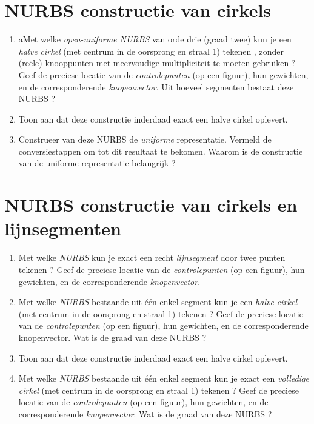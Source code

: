 \documentclass{report}
\begin{document}
	\section{NURBS constructie van cirkels }
	\begin{enumerate}
		\item aMet welke \textit{open-uniforme NURBS} van orde drie (graad twee) kun je een \textit{halve cirkel} (met centrum in de oorsprong en straal 1) tekenen , zonder (reële) knooppunten met meervoudige multipliciteit te moeten gebruiken ? Geef de preciese locatie van de \textit{controlepunten} (op een figuur), hun gewichten, en de corresponderende \textit{knopenvector}. Uit hoeveel segmenten bestaat deze NURBS ?
		
		\item Toon aan dat deze constructie inderdaad exact een halve cirkel oplevert.
		
		\item Construeer van deze NURBS de \textit{uniforme} representatie. Vermeld de conversiestappen om tot dit resultaat te bekomen. Waarom is de constructie van de uniforme representatie belangrijk ?
	\end{enumerate}

	\section{NURBS constructie van cirkels en lijnsegmenten  }
	\begin{enumerate}
		\item Met welke \textit{NURBS} kun je exact een recht \textit{lijnsegment} door twee punten tekenen ? Geef de preciese locatie van de \textit{controlepunten} (op een figuur), hun gewichten, en de corresponderende \textit{knopenvector}.
		
		\item Met welke \textit{NURBS} bestaande uit één enkel segment kun je een \textit{halve cirkel} (met centrum in de oorsprong en straal 1) tekenen ? Geef de preciese locatie van de \textit{controlepunten} (op een figuur), hun gewichten, en de corresponderende knopenvector\textit{}. Wat is de graad van deze NURBS ?
		
		\item Toon aan dat deze constructie inderdaad exact een halve cirkel oplevert.
		
		\item Met welke \textit{NURBS} bestaande uit één enkel segment kun je exact een \textit{volledige cirkel} (met centrum in de oorsprong en straal 1) tekenen ? Geef de preciese locatie van de \textit{controlepunten} (op een figuur), hun gewichten, en de corresponderende \textit{knopenvector}. Wat is de graad van deze NURBS ?
	\end{enumerate}
\end{document}
